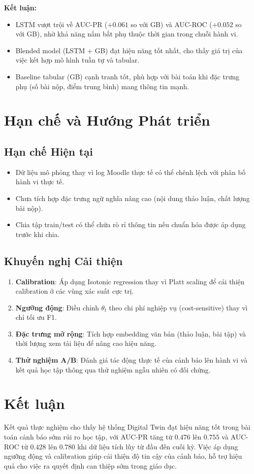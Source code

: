 \documentclass[12pt,a4paper]{article}
\begin{document}
\textbf{Kết luận:}
\begin{itemize}
    \item LSTM vượt trội về AUC-PR ($+0.061$ so với GB) và AUC-ROC ($+0.052$ so với GB), nhờ khả năng nắm bắt phụ thuộc thời gian trong chuỗi hành vi.
    \item Blended model (LSTM + GB) đạt hiệu năng tốt nhất, cho thấy giá trị của việc kết hợp mô hình tuần tự và tabular.
    \item Baseline tabular (GB) cạnh tranh tốt, phù hợp với bài toán khi đặc trưng phụ (số bài nộp, điểm trung bình) mang thông tin mạnh.
\end{itemize}

\section{Hạn chế và Hướng Phát triển}

\subsection{Hạn chế Hiện tại}
\begin{itemize}
    \item Dữ liệu mô phỏng thay vì log Moodle thực tế có thể chênh lệch với phân bố hành vi thực tế.
    \item Chưa tích hợp đặc trưng ngữ nghĩa nâng cao (nội dung thảo luận, chất lượng bài nộp).
    \item Chia tập train/test có thể chứa rò rỉ thông tin nếu chuẩn hóa được áp dụng trước khi chia.
\end{itemize}

\subsection{Khuyến nghị Cải thiện}
\begin{enumerate}
    \item \textbf{Calibration}: Áp dụng Isotonic regression thay vì Platt scaling để cải thiện calibration ở các vùng xác suất cực trị.
    \item \textbf{Ngưỡng động}: Điều chỉnh $\theta_t$ theo chi phí nghiệp vụ (cost-sensitive) thay vì chỉ tối ưu F1.
    \item \textbf{Đặc trưng mở rộng}: Tích hợp embedding văn bản (thảo luận, bài tập) và thời lượng xem tài liệu để nâng cao hiệu năng.
    \item \textbf{Thử nghiệm A/B}: Đánh giá tác động thực tế của cảnh báo lên hành vi và kết quả học tập thông qua thử nghiệm ngẫu nhiên có đối chứng.
\end{enumerate}

\section{Kết luận}

Kết quả thực nghiệm cho thấy hệ thống Digital Twin đạt hiệu năng tốt trong bài toán cảnh báo sớm rủi ro học tập, với AUC-PR tăng từ $0.476$ lên $0.755$ và AUC-ROC từ $0.428$ lên $0.780$ khi dữ liệu tích lũy từ đầu đến cuối kỳ. Việc áp dụng ngưỡng động và calibration giúp cải thiện độ tin cậy của cảnh báo, hỗ trợ hiệu quả cho việc ra quyết định can thiệp sớm trong giáo dục.
\end{document}
